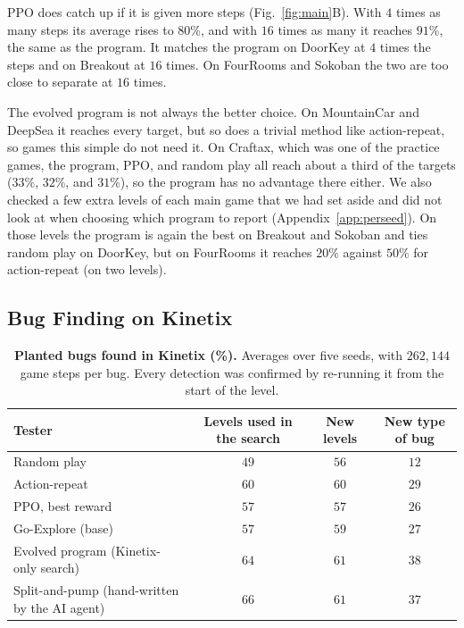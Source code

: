 \documentclass{article}
\begin{document}
PPO does catch up if it is given more steps (Fig.~\ref{fig:main}B). With $4$ times as many steps its average rises to
$80\%$, and with $16$ times as many it reaches $91\%$, the same as the program. It matches the program on DoorKey at
$4$ times the steps and on Breakout at $16$ times. On FourRooms and Sokoban the two are too close to separate at $16$
times.

The evolved program is not always the better choice. On MountainCar and DeepSea it reaches every target, but so does a trivial method like action-repeat, so games this simple do not need it. On Craftax, which was one of the practice games, the program, PPO, and random play all reach about a third of the targets ($33\%$, $32\%$, and $31\%$), so the program has no advantage there either. We also checked a few extra levels of each main game that we had set aside and did not look at when choosing which program to report (Appendix~\ref{app:perseed}). On those levels the program is again the best on Breakout and Sokoban and ties random play on DoorKey, but on FourRooms it reaches $20\%$ against $50\%$ for action-repeat (on two levels).

\subsection{Bug Finding on Kinetix}
\label{sec:kinetix}
\begin{table}[t]\centering\small
\caption{\textbf{Planted bugs found in Kinetix (\%).} Averages over five seeds, with $262{,}144$ game steps per bug. Every
detection was confirmed by re-running it from the start of the level.}
\label{tab:kinetix}
\begin{tabular}{@{}lccc@{}}\toprule
Tester & Levels used in the search & New levels & New type of bug \\ \midrule
Random play & $49$ & $56$ & $12$ \\
Action-repeat & $60$ & $60$ & $29$ \\
PPO, best reward & $57$ & $57$ & $26$ \\
Go-Explore (base) & $57$ & $59$ & $27$ \\ \midrule
Evolved program (Kinetix-only search) & $64$ & $61$ & $38$ \\
Split-and-pump (hand-written by the AI agent) & $66$ & $61$ & $37$ \\ \bottomrule
\end{tabular}
\end{table}
\end{document}
